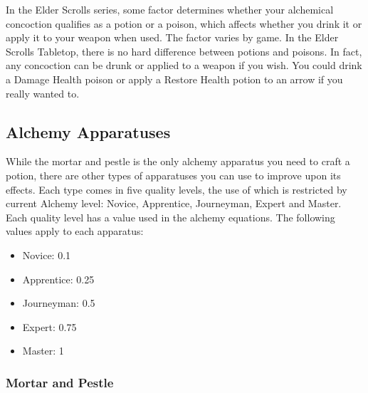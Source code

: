 \documentclass[12pt]{book}
\begin{document}
In the Elder Scrolls series, some factor determines whether your alchemical concoction qualifies as a potion or a poison, which affects whether you drink it or apply it to your weapon when used. The factor varies by game. In the Elder Scrolls Tabletop, there is no hard difference between potions and poisons. In fact, any concoction can be drunk or applied to a weapon if you wish. You could drink a Damage Health poison or apply a Restore Health potion to an arrow if you really wanted to.

\subsection{Alchemy Apparatuses}

While the mortar and pestle is the only alchemy apparatus you need to craft a potion, there are other types of apparatuses you can use to improve upon its effects. Each type comes in five quality levels, the use of which is restricted by current Alchemy level: Novice, Apprentice, Journeyman, Expert and Master. Each quality level has a value used in the alchemy equations. The following values apply to each apparatus:

\begin{itemize}
	\item Novice: 0.1
	\item Apprentice: 0.25
	\item Journeyman: 0.5
	\item Expert: 0.75
	\item Master: 1
\end{itemize}

\newpage
\subsubsection{Mortar and Pestle}
\end{document}
